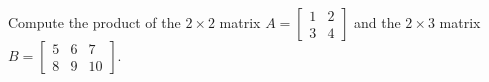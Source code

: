\documentclass[border=3bp]{standalone}
\begin{document}
\begin{minipage}{3.5in}
Compute the product of the $2 \times 2$ matrix
$A = \begin{bmatrix}
1 & 2 \\
3 & 4
\end{bmatrix}$
and the $2 \times 3$ matrix
$B = \begin{bmatrix}
5 & 6 & 7 \\
8 & 9 & 10
\end{bmatrix}$.
\end{minipage}
\end{document}
